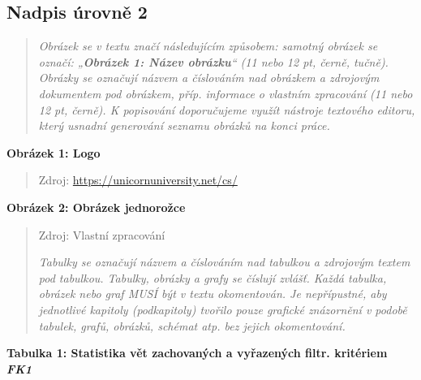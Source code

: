 \documentclass[
]{article}
\begin{document}
\hypertarget{nadpis-uxfarovnux11b-2-2}{%
\subsection{Nadpis úrovně 2}\label{nadpis-uxfarovnux11b-2-2}}

\begin{quote}
\emph{Obrázek se v textu značí následujícím způsobem: samotný obrázek se
označí: „\textbf{Obrázek 1: Název obrázku}`` (11 nebo 12 pt, černě,
tučně). Obrázky se označují názvem a číslováním nad obrázkem a zdrojovým
dokumentem pod obrázkem, příp. informace o vlastním zpracování (11 nebo
12 pt, černě). K popisování doporučujeme využít nástroje textového
editoru, který usnadní generování seznamu obrázků na konci práce.}
\end{quote}

\textbf{Obrázek 1: Logo}


\begin{quote}
Zdroj: \url{https://unicornuniversity.net/cs/}
\end{quote}

\newpage
\textbf{Obrázek 2: Obrázek jednorožce}

\begin{quote}

Zdroj: Vlastní zpracování

\emph{Tabulky se označují názvem a číslováním nad tabulkou a zdrojovým
textem pod tabulkou. Tabulky, obrázky a grafy se číslují zvlášť. Každá
tabulka, obrázek nebo graf MUSÍ být v textu okomentován. Je nepřípustné,
aby jednotlivé kapitoly (podkapitoly) tvořilo pouze grafické znázornění
v podobě tabulek, grafů, obrázků, schémat atp. bez jejich okomentování.}
\end{quote}

\protect\hypertarget{_bookmark9}{}{}\textbf{Tabulka 1: Statistika vět
zachovaných a vyřazených filtr. kritériem \emph{FK1}}
\end{document}
